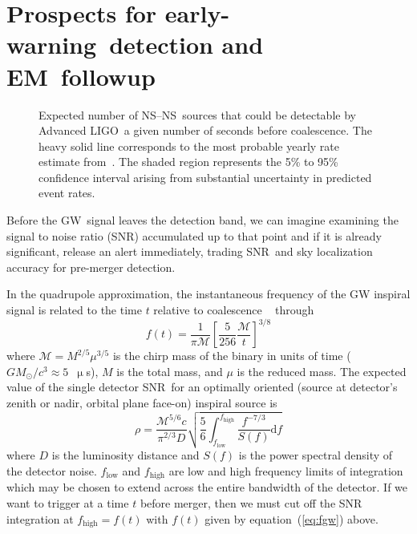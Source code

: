 \documentclass[preprint2]{aastex}
\newcommand{\earlywarning}{early-warning}
\newcommand{\NS}{NS}
\newcommand{\GW}{GW}%
\newcommand{\EM}{EM}%
\newcommand{\LIGO}{LIGO}%
\newcommand{\SNR}{SNR}%
\begin{document}
\section{Prospects for \earlywarning\ detection and \EM\ followup}

\begin{figure}[h]
\caption{\label{fig:earlywarning}Expected number of \NS--\NS\
sources that could be detectable by Advanced \LIGO\ a given number of seconds
before coalescence.  The heavy solid line corresponds to the most probable yearly rate
estimate from~\citet{Abadie:2010p10836}.  The shaded region represents the 5\% to 95\% confidence interval
arising from substantial uncertainty in predicted event rates.}
\end{figure}
%
Before the \GW\ signal leaves the detection band, we can imagine examining the
signal to noise ratio (\SNR) accumulated up to that point and if it is
already significant, release an alert immediately, trading \SNR\ and sky
localization accuracy for pre-merger detection.

In the quadrupole approximation, the instantaneous frequency of the GW inspiral signal is related to the time $t$ relative to coalescence ~\citep{kidder1992, findchirppaper} through
%
\begin{equation} \label{eq:fgw}
	f(t) = \frac{1}{\pi \mathcal{M}}
		\left[ \frac{5}{256}\frac{\mathcal{M}}{t} \right]^{3/8}
\end{equation}
%
where $\mathcal{M} = M^{2/5} \mu^{3/5}$ is the chirp mass of the binary in units of time ($G
M_\odot / c^3 \approx 5$~$\upmu$s), $M$ is the total mass, and $\mu$ is the reduced mass. 
The expected value of the single detector \SNR\ for an optimally oriented (source at detector's zenith or nadir, orbital plane face-on) inspiral source is~\citep{Abadie:2010p10836}
%
\begin{equation}
	\label{eq:expected-snr}
	\rho =
		\frac{\mathcal{M}^{5/6} c}{\pi^{2/3} D}
		\sqrt{
			\frac{5}{6} \int_{f_\mathrm{low}}^{f_\mathrm{high}}
			\frac{f^{-7/3}}{S(f)} \mathrm{d}f}
\end{equation}
%
where $D$ is the luminosity distance and $S(f)$ is the power spectral density of the detector noise.  $f_\mathrm{low}$ and $f_\mathrm{high}$ are low and high frequency limits of integration which may be chosen to extend across the entire bandwidth of the detector.  If we want to trigger at a time $t$ before merger, then we must cut off the SNR integration at $f_\mathrm{high} = f(t)$ with $f(t)$ given by equation~(\ref{eq:fgw}) above.
\end{document}
